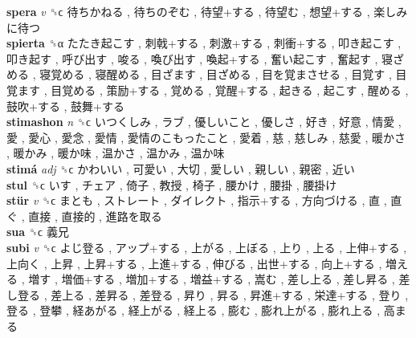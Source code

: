 \textbf{spera} \emph{v}  ␝ϲ   待ちかねる ,  待ちのぞむ ,  待望+する ,  待望む ,  想望+する ,  楽しみに待つ   \\
\textbf{spierta} ␝α   たたき起こす ,  刺戟+する ,  刺激+する ,  刺衝+する ,  叩き起こす ,  叩き起す ,  呼び出す ,  唆る ,  喚び出す ,  喚起+する ,  奮い起こす ,  奮起す ,  寝ざめる ,  寝覚める ,  寝醒める ,  目ざます ,  目ざめる ,  目を覚まさせる ,  目覚す ,  目覚ます ,  目覚める ,  策励+する ,  覚める ,  覚醒+する ,  起きる ,  起こす ,  醒める ,  鼓吹+する ,  鼓舞+する   \\
\textbf{stimashon} \emph{n}  ␝ϲ   いつくしみ ,  ラブ ,  優しいこと ,  優しさ ,  好き ,  好意 ,  情愛 ,  愛 ,  愛心 ,  愛念 ,  愛情 ,  愛情のこもったこと ,  愛着 ,  慈 ,  慈しみ ,  慈愛 ,  暖かさ ,  暖かみ ,  暖か味 ,  温かさ ,  温かみ ,  温か味   \\
\textbf{stimá} \emph{adj}  ␝ϲ   かわいい ,  可愛い ,  大切 ,  愛しい ,  親しい ,  親密 ,  近い   \\
\textbf{stul} ␝ϲ   いす ,  チェア ,  倚子 ,  教授 ,  椅子 ,  腰かけ ,  腰掛 ,  腰掛け   \\
\textbf{stür} \emph{v}  ␝ϲ   まとも ,  ストレート ,  ダイレクト ,  指示+する ,  方向づける ,  直 ,  直ぐ ,  直接 ,  直接的 ,  進路を取る   \\
\textbf{sua} ␝ϲ   義兄   \\
\textbf{subi} \emph{v}  ␝ϲ   よじ登る ,  アップ+する ,  上がる ,  上ぼる ,  上り ,  上る ,  上伸+する ,  上向く ,  上昇 ,  上昇+する ,  上進+する ,  伸びる ,  出世+する ,  向上+する ,  増える ,  増す ,  増価+する ,  増加+する ,  増益+する ,  嵩む ,  差し上る ,  差し昇る ,  差し登る ,  差上る ,  差昇る ,  差登る ,  昇り ,  昇る ,  昇進+する ,  栄達+する ,  登り ,  登る ,  登攀 ,  経あがる ,  経上がる ,  経上る ,  膨む ,  膨れ上がる ,  膨れ上る ,  高まる   \\
